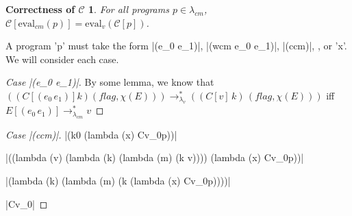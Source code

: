 \documentclass[ms,electronic,twosidetoc,letterpaper,chaptercenter,parttop]{byumsphd}
\begin{document}
\newtheorem*{maintheorem}{Correctness of $\mathcal{C}$}
\begin{maintheorem}
For all programs $p\in\lambda_{cm}$, $\mathcal{C}[\mathrm{eval}_{cm}(p)]=\mathrm{eval}_{v}(\mathcal{C}[p])$.
\end{maintheorem}
A program \scheme'p' must take the form \scheme|(e_0 e_1)|, \scheme|(wcm e_0 e_1)|, \scheme|(ccm)|, , or \scheme'x'. We will consider each case.







\begin{proof}[Case \scheme|(e_0 e_1)|]




By some lemma, we know that $((C[(e_0\,e_1)] k) (flag,\chi(E)))\rightarrow_{\lambda_{v}}^{*}((C[v]\,k)\,(flag,\chi(E)))$ iff $E[(e_0\,e_1)]\rightarrow_{\lambda_{cm}}^{*}v$
\end{proof}

\begin{proof}[Case \scheme|(ccm)|]


% 


\scheme|(k0 (lambda (x) Cv_0p))|

\scheme|((lambda (v) (lambda (k) (lambda (m) (k v)))) (lambda (x) Cv_0p))|

\scheme|(lambda (k) (lambda (m) (k (lambda (x) Cv_0p))))|

\scheme|Cv_0|
\end{proof}
\end{document}

